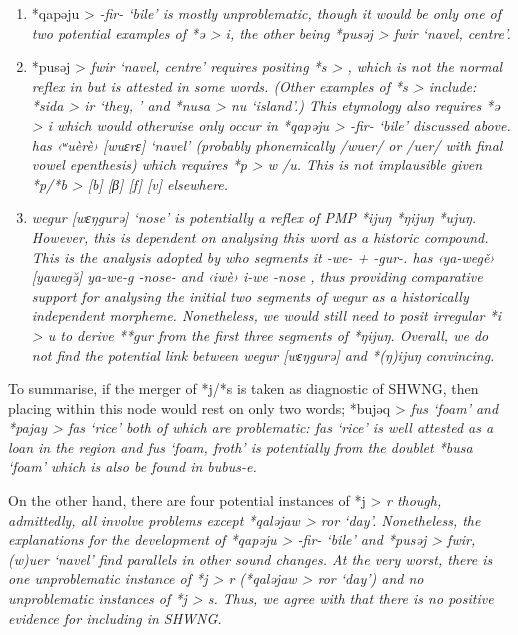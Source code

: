 \begin{enumerate}
{						*əsa > \it{eso} ‘one’ ( \it{esu}),
						and *pusəj > \it{wuer} [wuɛrɛ] ‘navel’ ( \it{fwir} ‘navel’).}
	\item	*qapəju >  \it{-fir-} ‘bile’ is mostly unproblematic,
				though it would be only one of two potential examples of *ə >
				\it{i}, the other being *pusəj > \it{fwir} ‘navel, centre’.
	\item	*pusəj > \it{fwir} ‘navel,
				centre’ requires positing *s > {\0},
				which is not the normal reflex in  but is attested in some words.
				(Other examples of *s > {\0} include: *sida > \it{ir} ‘they,
				’ and *nusa > \it{nu} ‘island’.) This etymology also
				requires *ə > \it{i} which would otherwise only occur in *qapəju
				> \it{-fir-} ‘bile’ discussed above.
				 has ‹ʷuèrè› [wuɛrɛ] ‘navel’ (probably phonemically /wuer/
				or /uer/ with final vowel epenthesis) which requires *p > \it{w} /{\gap}\it{u}.
				This is not implausible given  *p/*b > [b] {\tl} [β] {\tl}
				[f] {\tl} [v] elsewhere.
	\item	\it{wegur} [wɛŋgurə] ‘nose’ is potentially a reflex of
				PMP *ijuŋ {\tl} *ŋijuŋ {\tl} *ujuŋ.
				However, this is dependent on analysing this word as a historic compound.
				This is the analysis adopted by \citet[125]{Jackson2014} who segments it \it{-we- + -gur-}.
				 has ‹ya-wegě› [yawegə̆] \it{ya-we-g} \tsc{1sg}-nose-
				and ‹iwè› \it{i-we} -nose \citep[34]{SmitsVoorhoeve1992a},
				thus providing comparative support for analysing the initial
				two segments of  \it{wegur} as a historically independent morpheme.
				Nonetheless, we would still need to posit irregular *i > \it{u}
				to derive **gur from the first three segments of *ŋijuŋ.
				Overall, we do not find the potential link between \it{wegur} [wɛŋgurə]
				and *(ŋ)ijuŋ convincing.
\end{enumerate}

To summarise,
if the merger of *j/*s is taken as diagnostic of SHWNG,
then placing  within this node would rest on only two
words; *bujəq > \it{fus} ‘foam’
and *pajay > \it{fas} ‘rice’ both of which are problematic: \it{fas}
‘rice’ is well attested as a loan in the region
and \it{fus} ‘foam, froth’ is potentially from the doublet *busa
‘foam’ which is also be found in  \it{bu{\tl}bus-e}.

On the other hand,
there are four potential instances of *j > \it{r} though,
admittedly, all involve problems except *qaləjaw >  \it{ror} ‘day’.
Nonetheless, the explanations for the development of *qapəju
> \it{-fir-} ‘bile’ and *pusəj >  \it{fwir},
 \it{(w)uer} ‘navel’ find parallels in other sound changes.
At the very worst,
there is one unproblematic instance of *j > \it{r} (*qaləjaw
>  \it{ror} ‘day’)
and no unproblematic instances of *j > \it{s}.
Thus, we agree with \citet{Blust1993} that there is no positive
evidence for including  in SHWNG.

